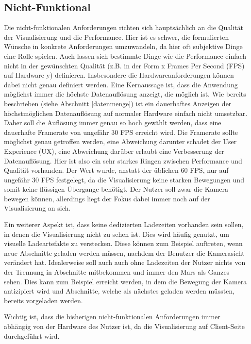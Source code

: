 \subsection{Nicht-Funktional}
Die nicht-funktionalen Anforderungen richten sich hauptsächlich an die Qualität der Visualisierung und die Performance. Hier ist es schwer, die formulierten Wünsche in konkrete Anforderungen umzuwandeln, da hier oft subjektive Dinge eine Rolle spielen. Auch lassen sich bestimmte Dinge wie die Performance einfach nicht in der gewünschten Qualität (z.B. in der Form x Frames Per Second (FPS) auf Hardware y) definieren. Insbesondere die Hardwareanforderungen können dabei nicht genau definiert werden. Eine Kernaussage ist, dass die Anwendung möglichst immer die höchste Datenauflösung anzeigt, die möglich ist. Wie bereits beschrieben (siehe Abschnitt \ref{datenmenge}) ist ein dauerhaftes Anzeigen der höchstmöglichen Datenauflösung auf normaler Hardware einfach nicht umsetzbar. Daher soll die Auflösung immer genau so hoch gewählt werden, dass eine dauerhafte Framerate von ungefähr 30 FPS erreicht wird. Die Framerate sollte möglichst genau getroffen werden, eine Abweichung darunter schadet der User Experience (UX), eine Abweichung darüber erlaubt eine Verbesserung der Datenauflösung. Hier ist also ein sehr starkes Ringen zwischen Performance und Qualität vorhanden. Der Wert wurde, anstatt der üblichen 60 FPS, nur auf ungefähr 30 FPS festgelegt, da die Visualisierung keine starken Bewegungen und somit keine flüssigen Übergange benötigt. Der Nutzer soll zwar die Kamera bewegen können, allerdings liegt der Fokus dabei immer noch auf der Visualisierung an sich.

Ein weiterer Aspekt ist, dass keine dedizierten Ladezeiten vorhanden sein sollen, in denen die Visualisierung nicht zu sehen ist. Dies wird häufig genutzt, um visuelle Ladeartefakte zu verstecken. Diese können zum Beispiel auftreten, wenn neue Abschnitte geladen werden müssen, nachdem der Benutzer die Kamerasicht verändert hat. Idealerweise soll auch auch ohne Ladezeiten der Nutzer nichts von der Trennung in Abschnitte mitbekommen und immer den Mars als Ganzes sehen. Dies kann zum Beispiel erreicht werden, in dem die Bewegung der Kamera antizipiert wird und Abschnitte, welche als nächstes geladen werden müssten, bereits vorgeladen werden. 

Wichtig ist, dass die bisherigen nicht-funktionalen Anforderungen immer abhängig von der Hardware des Nutzer ist, da die Visualisierung auf Client-Seite durchgeführt wird. 

